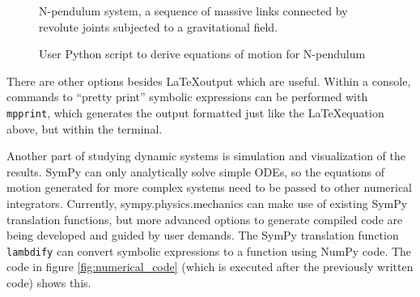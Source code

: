 \documentclass[twocolumn,10pt]{asme2e}
\newcommand{\drawpendulum}[6]{
  \def \x {#1}
  \def \y {#2}
  \def \theta {#3}
  \def \length {#4}
  \def \m {#5}
  \def \index {#6}
  \pgftransformshift{\pgfpoint{\x}{\y}}
  \draw[dashed] (0,0)--(0,-\length);
  \draw[->] (0,-0.75*\length) arc (-90:\theta-90:0.75*\length);
  \pgftransformrotate{\theta/2}
  \node at (0,-0.90*\length) {$q_{\scriptscriptstyle\index}$};
  \pgftransformrotate{\theta/2}
  \draw [thick] (0,0)--(0,-\length);
  \draw[snake=brace] (\m+1mm,0)--(\m+1mm,-\length);
  \node at (\m+6mm,-0.5*\length) {$l_{\scriptscriptstyle\index}$};
  \shade[ball color=black] (0,-\length) circle (\m);
  \pgftransformshift{\pgfpoint{0}{-\length}}
  \pgftransformrotate{-\theta}
  \node at (-\m/2-2mm, -\m/2-2mm) {$m_{\scriptscriptstyle\index}$};
  \pgftransformrotate{\theta}
  \pgftransformshift{\pgfpoint{0}{\length}}

  \pgftransformrotate{-\theta}
  \pgftransformshift{\pgfpoint{-\x}{-\y}}
}
\begin{document}
\begin{figure}
\begin{center}
\end{center}
\caption{N-pendulum system, a sequence of massive links connected by revolute
joints subjected to a gravitational field.}
\label{fig:n_pendulum}
\end{figure}

\begin{figure}
\caption{User Python script to derive equations of motion for N-pendulum}
\label{fig:n_pendulum_source}
\end{figure}

There are other options besides \LaTeX output which are useful. Within a
console, commands to ``pretty print'' symbolic expressions can be performed
with \verb|mpprint|, which generates the output formatted just like the
\LaTeX equation above, but within the terminal.

Another part of studying dynamic systems is simulation and visualization of the
results. SymPy can only analytically solve simple ODEs, so the equations of
motion generated for more complex systems need to be passed to other numerical
integrators. Currently, sympy.physics.mechanics can make use of existing SymPy
translation functions, but more advanced options to generate compiled code are
being developed and guided by user demands. The SymPy translation function
\verb|lambdify| can convert symbolic expressions to a function using NumPy
code. The code in figure \ref{fig:numerical_code} (which is executed after the
previously written code) shows this.
\end{document}
